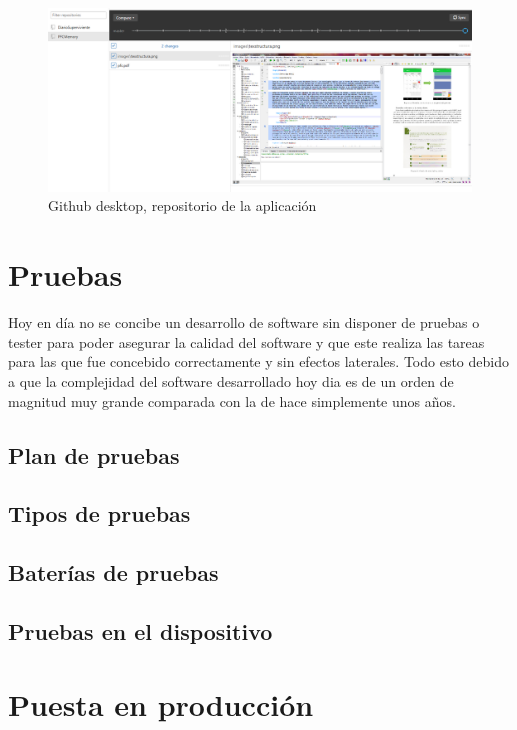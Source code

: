 \documentclass[../pfc.tex]{subfiles}
\begin{document}
	
	\begin{figure}[H]
		\centering
		\includegraphics[width=1\linewidth]{../images/githubdesktopmemory}
		\caption{Github desktop, repositorio de la aplicación}
		\label{fig:ghdesktopM}
	\end{figure}
	
	
	\section{Pruebas}
	
	Hoy en día no se concibe un desarrollo de software sin disponer de pruebas o tester para poder asegurar la calidad del software y que este realiza las tareas para las que fue concebido correctamente y sin efectos laterales. Todo esto debido a que la complejidad del software desarrollado hoy dia es de un orden de magnitud muy grande comparada con la de hace simplemente unos años.
	
	
	
	\subsection{Plan de pruebas}
	
	\subsection{Tipos de pruebas}
		
	\subsection{Baterías de pruebas}
		
	\subsection{Pruebas en el dispositivo}
	
	\section{Puesta en producción}
	
\end{document}
